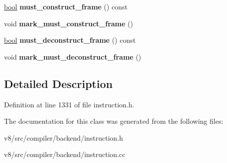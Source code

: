 \begin{DoxyCompactItemize}
\mbox{\hyperlink{classbool}{bool}} {\bfseries must\+\_\+construct\+\_\+frame} () const
\item 
\mbox{\label{classv8_1_1internal_1_1compiler_1_1InstructionBlock_aeaf177b43c062c481c9ad03c0d7daccc}} 
void {\bfseries mark\+\_\+must\+\_\+construct\+\_\+frame} ()
\item 
\mbox{\label{classv8_1_1internal_1_1compiler_1_1InstructionBlock_aecefa6f4a6c9a97aa9828e7a33e8d1be}} 
\mbox{\hyperlink{classbool}{bool}} {\bfseries must\+\_\+deconstruct\+\_\+frame} () const
\item 
\mbox{\label{classv8_1_1internal_1_1compiler_1_1InstructionBlock_a7d8ea653e569ce5d4fe41c36fccd8f07}} 
void {\bfseries mark\+\_\+must\+\_\+deconstruct\+\_\+frame} ()
\end{DoxyCompactItemize}


\subsection{Detailed Description}


Definition at line 1331 of file instruction.\+h.



The documentation for this class was generated from the following files\+:\begin{DoxyCompactItemize}
\item 
v8/src/compiler/backend/instruction.\+h\item 
v8/src/compiler/backend/instruction.\+cc\end{DoxyCompactItemize}
